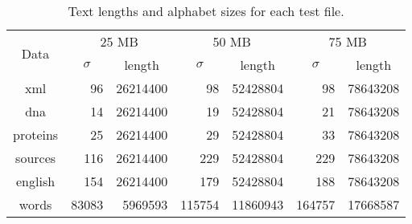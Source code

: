 \begin{center}
\begin{table}[h]
\begin{tabular}{crrrrrr}
\toprule
\multirow{2}{*}{Data} & \multicolumn{2}{c}{25 MB} & \multicolumn{2}{c}{50 MB} &  
	\multicolumn{2}{c}{75 MB}\\
		  \cmidrule(r){2-7}
	      &\multicolumn{1}{c}{$\sigma$}& \multicolumn{1}{c}{length}
		  &\multicolumn{1}{c}{$\sigma$}&\multicolumn{1}{c}{length}
		  &\multicolumn{1}{c}{$\sigma$}&\multicolumn{1}{c}{length}\\
\midrule
xml 	  & 96	   & 26214400 & 98 	   & 52428804 & 98 	   & 78643208 \\
dna 	  & 14     & 26214400 & 19 	   & 52428804 & 21     & 78643208 \\
proteins  & 25     & 26214400 & 29     & 52428804 & 33     & 78643208 \\
sources   & 116    & 26214400 & 229    & 52428804 & 229    & 78643208 \\
english   & 154    & 26214400 & 179    & 52428804 & 188    & 78643208 \\
words     & 83083  & 5969593  & 115754 & 11860943 & 164757 & 17668587 \\
\bottomrule
\end{tabular}
\caption{Text lengths and alphabet sizes for each test file.}
\label{tab:files}
\end{table}
\end{center}
